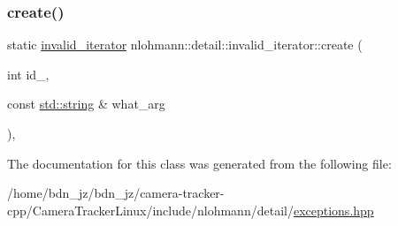\subsubsection{\texorpdfstring{create()}{create()}}
{\footnotesize\ttfamily static \hyperlink{classnlohmann_1_1detail_1_1invalid__iterator}{invalid\+\_\+iterator} nlohmann\+::detail\+::invalid\+\_\+iterator\+::create (\begin{DoxyParamCaption}\item[{int}]{id\+\_\+,  }\item[{const \hyperlink{namespacenlohmann_1_1detail_a1ed8fc6239da25abcaf681d30ace4985ab45cffe084dd3d20d928bee85e7b0f21}{std\+::string} \&}]{what\+\_\+arg }\end{DoxyParamCaption})\hspace{0.3cm}{\ttfamily [inline]}, {\ttfamily [static]}}



The documentation for this class was generated from the following file\+:\begin{DoxyCompactItemize}
\item 
/home/bdn\+\_\+jz/bdn\+\_\+jz/camera-\/tracker-\/cpp/\+Camera\+Tracker\+Linux/include/nlohmann/detail/\hyperlink{exceptions_8hpp}{exceptions.\+hpp}\end{DoxyCompactItemize}
